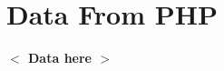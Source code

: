 \documentclass{article}
\newcommand{\placeholder}[1]{\textbf{$<$ #1 $>$}}
\newcommand{\test}{\placeholder{Data here}}
\begin{document}
	\section{Data From PHP}
	\test{}
\end{document}
